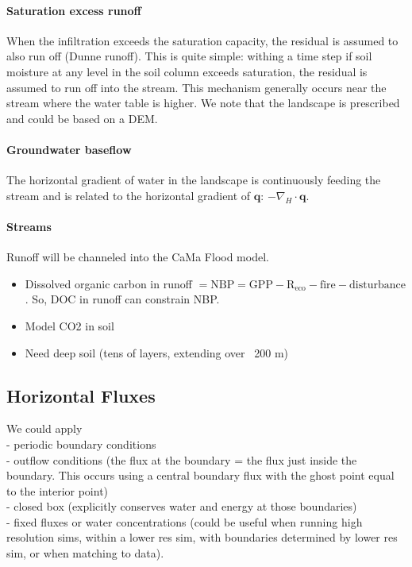 \documentclass[twoside,10pt]{report}
\begin{document}
\paragraph{Saturation excess runoff}
When the infiltration exceeds the saturation capacity, the residual is assumed to also run off (Dunne runoff). This is quite simple: withing a time step if soil moisture at any level in the soil column exceeds saturation, the residual is assumed to run off into the stream. This mechanism generally occurs near the stream where the water table is higher. We note that the landscape is prescribed and could be based on a DEM. 

\paragraph{Groundwater baseflow}
The horizontal gradient of water in the landscape is continuously feeding the stream and is related to the horizontal gradient of $\mathbf{q}$: $-\nabla_H \cdot \mathbf{q}$.

\paragraph{Streams}
Runoff will be channeled into the CaMa Flood model.

\begin{itemize}
\item Dissolved organic carbon in runoff $\mathrm{= NBP = GPP - R_{eco} - fire - disturbance}$. So, DOC in runoff can constrain NBP.

\item Model CO2 in soil
\item Need deep soil (tens of layers, extending over ~200 m)
\end{itemize}

\subsection{Horizontal Fluxes}
We could apply 
\\
- periodic boundary conditions
\\
- outflow conditions (the flux at the boundary = the flux just inside the boundary. This occurs using a central boundary flux with the ghost point equal to the interior point)
\\
- closed box (explicitly conserves water and energy at those boundaries)
\\
- fixed fluxes or water concentrations (could be useful when running high resolution sims, within a lower res sim, with boundaries determined by lower res sim, or when matching to data).
\end{document}
